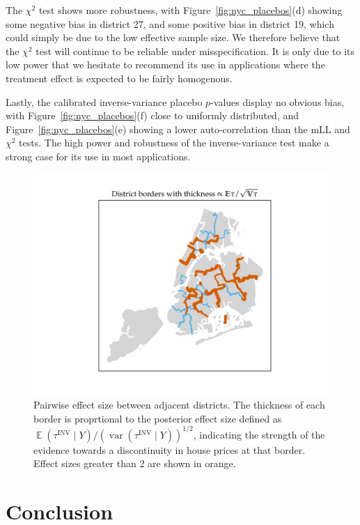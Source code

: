 \documentclass[letter]{article}
\makeatletter
\def\maxwidth{\ifdim\Gin@nat@width>\linewidth\linewidth
\else\Gin@nat@width\fi}
\let\Oldincludegraphics\includegraphics
\renewcommand{\includegraphics}[1]{\Oldincludegraphics[width=0.9\maxwidth]{#1}}
\DeclareMathOperator{\E}{\mathbb{E}}
\DeclareMathOperator{\var}{{var}}
\newcommand{\invvar}{\tau^{\mathrm{INV}}}
\makeatother
\begin{document}
The \(\chi^2\) test shows more robustness, with Figure~\ref{fig:nyc_placebos}(d) showing some negative bias in district 27, and some positive bias in district 19, which could simply be due to the low effective sample size.
We therefore believe that the \(\chi^2\) test will continue to be reliable under misspecification.
It is only due to its low power that we hesitate to recommend its use in applications where the treatment effect is expected to be fairly homogenous.

Lastly, the calibrated inverse-variance placebo \(p\)-values display no obvious bias, with Figure~\ref{fig:nyc_placebos}(f) close to uniformly distributed, and Figure~\ref{fig:nyc_placebos}(e) showing a lower auto-correlation than the mLL and \(\chi^2\) tests.
The high power and robustness of the inverse-variance test make a strong case for its use in most applications.
    


    	\begin{figure}
\centering
\includegraphics{../NYC/NYC_plots/pairwise_multi.png}
\caption{\label{fig:NYC_pairwise} Pairwise effect size between adjacent districts. The thickness of each border is proprtional to the posterior effect size defined as \(\E(\invvar \mid Y) \big/ (\var(\invvar \mid Y))^{1/2}\), indicating the strength of the evidence towards a discontinuity in house prices at that border. Effect sizes greater than 2 are shown in orange.}
\end{figure}
    


    	\section{Conclusion}\label{conclusion}
    
\end{document}
